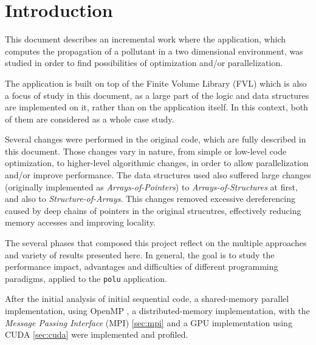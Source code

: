 \section{Introduction}
\label{sec:intro}

This document describes an incremental work where the \polu application, which computes the propagation of a pollutant in a two dimensional environment, was studied in order to find possibilities of optimization and/or parallelization.

The \polu application is built on top of the Finite Volume Library (FVL) which is also a focus of study in this document, as a large part of the logic and data structures are implemented on it, rather than on the application itself. In this context, both of them are considered as a whole case study.

Several changes were performed in the original code, which are fully described in this document. Those changes vary in nature, from simple or low-level code optimization, to higher-level algorithmic changes, in order to allow parallelization and/or improve performance. The data structures used also suffered large changes (originally implemented as \textit{Arrays-of-Pointers}) to \textit{Arrays-of-Structures} at first, and also to \textit{Structure-of-Arrays}. This changes removed excessive dereferencing caused by deep chains of pointers in the original strucutres, effectively reducing memory accesses and improving locality.

The several phases that composed this project reflect on the multiple approaches and variety of results presented here. In general, the goal is to study the performance impact, advantages and difficulties of different programming paradigms, applied to the \texttt{polu} application. 



After the initial analysis of initial sequential code, a shared-memory parallel implementation, using OpenMP , a distributed-memory implementation, with the \textit{Message Passing Interface} (MPI) \cref{sec:mpi} and a GPU implementation using CUDA \cref{sec:cuda} were implemented and profiled.
